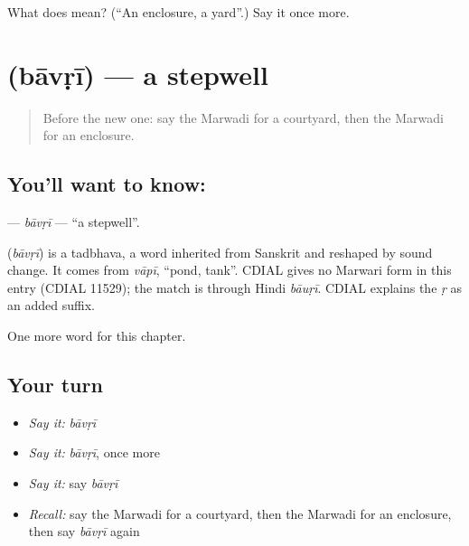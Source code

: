 \begin{tcolorbox}[breakable,colback=teal!4,colframe=teal!35!black,title={Before you move on}]
What does  mean? (\textquotedblleft{}An enclosure, a yard\textquotedblright{}.) Say it once more.
\end{tcolorbox}
\section[\texorpdfstring{\mw{बावड़ी} (bāvṛī)}{बावड़ी (bāvṛī)}]{ (bāvṛī) — a stepwell}

\label{lesson:MW-C99-bavri}



\begin{quote}
Before the new one: say the Marwadi for a courtyard, then the Marwadi for an enclosure.
\end{quote}

\subsection*{You'll want to know: }
\textbf{} — \emph{bāvṛī} — \textquotedblleft{}a stepwell\textquotedblright{}.

\begin{cousinweb}
\textbf{} (\emph{bāvṛī}) is a tadbhava, a word inherited from Sanskrit and reshaped by sound change. It comes from \emph{vāpī}, \textquotedblleft{}pond, tank\textquotedblright{}. CDIAL gives no Marwari form in this entry (CDIAL 11529); the match is through Hindi \emph{bāuṛī}. CDIAL explains the \emph{ṛ} as an added suffix.
\end{cousinweb}

\begin{grammarlens}[title={What you've built}]
One more word for this chapter.
\end{grammarlens}

\subsection*{Your turn}
\begin{itemize}
\raggedright
  \item \emph{Say it:} \emph{bāvṛī}
  \item \emph{Say it:} \emph{bāvṛī}, once more
  \item \emph{Say it:} say \emph{bāvṛī}
  \item \emph{Recall:} say the Marwadi for a courtyard, then the Marwadi for an enclosure, then say \emph{bāvṛī} again
\end{itemize}

